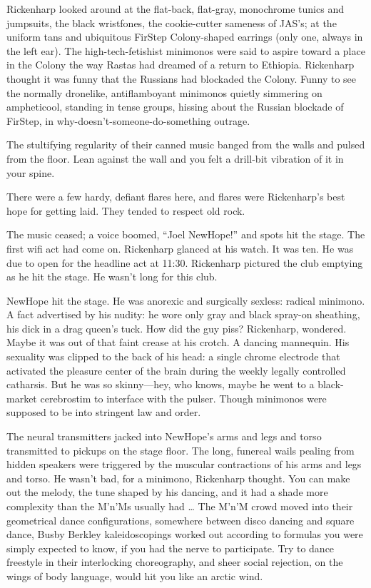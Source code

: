 Rickenharp looked around at the flat-back, flat-gray, monochrome tunics and jumpsuits, the black wristfones, the cookie-cutter sameness of JAS’s; at the uniform tans and ubiquitous FirStep Colony-shaped earrings (only one, always in the left ear). The high-tech-fetishist minimonos were said to aspire toward a place in the Colony the way Rastas had dreamed of a return to Ethiopia. Rickenharp thought it was funny that the Russians had blockaded the Colony. Funny to see the normally dronelike, antiflamboyant minimonos quietly simmering on ampheticool, standing in tense groups, hissing about the Russian blockade of FirStep, in why-doesn’t-someone-do-something outrage.

The stultifying regularity of their canned music banged from the walls and pulsed from the floor. Lean against the wall and you felt a drill-bit vibration of it in your spine.

There were a few hardy, defiant flares here, and flares were Rickenharp’s best hope for getting laid. They tended to respect old rock.

The music ceased; a voice boomed, “Joel NewHope!” and spots hit the stage. The first wifi act had come on. Rickenharp glanced at his watch. It was ten. He was due to open for the headline act at 11:30. Rickenharp pictured the club emptying as he hit the stage. He wasn’t long for this club.

NewHope hit the stage. He was anorexic and surgically sexless: radical minimono. A fact advertised by his nudity: he wore only gray and black spray-on sheathing, his dick in a drag queen’s tuck. How did the guy piss? Rickenharp, wondered. Maybe it was out of that faint crease at his crotch. A dancing mannequin. His sexuality was clipped to the back of his head: a single chrome electrode that activated the pleasure center of the brain during the weekly legally controlled catharsis. But he was so skinny—hey, who knows, maybe he went to a black-market cerebrostim to interface with the pulser. Though minimonos were supposed to be into stringent law and order.

The neural transmitters jacked into NewHope’s arms and legs and torso transmitted to pickups on the stage floor. The long, funereal wails pealing from hidden speakers were triggered by the muscular contractions of his arms and legs and torso. He wasn’t bad, for a minimono, Rickenharp thought. You can make out the melody, the tune shaped by his dancing, and it had a shade more complexity than the M’n’Ms usually had … The M’n’M crowd moved into their geometrical dance configurations, somewhere between disco dancing and square dance, Busby Berkley kaleidoscopings worked out according to formulas you were simply expected to know, if you had the nerve to participate. Try to dance freestyle in their interlocking choreography, and sheer social rejection, on the wings of body language, would hit you like an arctic wind.

